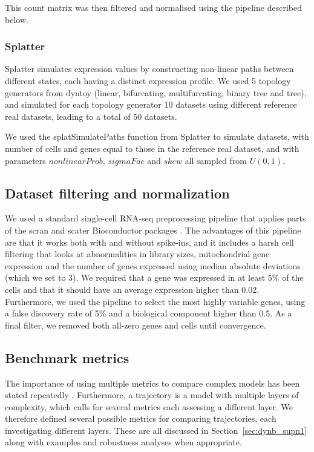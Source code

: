 This count matrix was then filtered and normalised using the pipeline described below.

\subsubsection{Splatter}

Splatter \cite{zappia_splattersimulationsinglecell_2017} simulates expression values by constructing non-linear paths between different states, each having a distinct expression profile. We used 5 topology generators from dyntoy (linear, bifurcating, multifurcating, binary tree and tree), and simulated for each topology generator 10 datasets using different reference real datasets, leading to a total of 50 datasets.

We used the splatSimulatePaths function from Splatter to simulate datasets, with number of cells and genes equal to those in the reference real dataset, and with parameters  $\textit{nonlinearProb}$, $\textit{sigmaFac}$ and $\textit{skew}$ all sampled from $U(0, 1)$.

\subsection{Dataset filtering and normalization}

We used a standard single-cell RNA-seq preprocessing pipeline that applies parts of the scran and scater Bioconductor packages \cite{lun_stepbystepworkflowlowlevel_2016}. The advantages of this pipeline are that it works both with and without spike-ins, and it includes a harsh cell filtering that looks at abnormalities in library sizes, mitochondrial gene expression and the number of genes expressed using median absolute deviations (which we set to 3). We required that a gene was expressed in at least 5$\%$ of the cells and that it should have an average expression higher than 0.02. Furthermore, we used the pipeline to select the most highly variable genes, using a false discovery rate of 5$\%$ and a biological component higher than 0.5. As a final filter, we removed both all-zero genes and cells until convergence.

\subsection{Benchmark metrics}

The importance of using multiple metrics to compare complex models has been stated repeatedly \cite{norel_selfassessmenttrapcan_2011}. Furthermore, a trajectory is a model with multiple layers of complexity, which calls for several metrics each assessing a different layer. We therefore defined several possible metrics for comparing trajectories, each investigating different layers. These are all discussed in Section~\ref{sec:dynb_supn1} along with examples and robustness analyses when appropriate.

